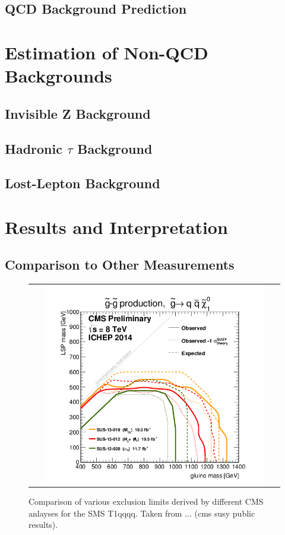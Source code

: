 \subsection{QCD Background Prediction}
\label{subsec:RA2_qcd_pred}

\section{Estimation of Non-QCD Backgrounds}
\label{sec:RA2_Non-QCD}

\subsection{Invisible Z Background}
\label{subsec:RA2_Zinv}

\subsection{Hadronic $\tau$ Background}
\label{subsec:RA2_tauhad}

\subsection{Lost-Lepton Background}
\label{subsec:RA2_lostlepton}

\section{Results and Interpretation}
\label{sec:RA2_results}

\subsection{Comparison to Other Measurements}
\label{subsec:RA2_comp}

\begin{figure}[!tp]
  \centering
  \begin{tabular}{c}
    \includegraphics[width=0.9\textwidth]{figures/T1_ICHEP2014_All.png}
  \end{tabular}
  \caption{Comparison of various exclusion limits derived by different CMS anlayses for the SMS T1qqqq. Taken from ... (cms susy public results).}
  \label{fig:T1_comp}
\end{figure}

